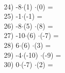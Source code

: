 \documentclass[a4paper,10pt]{article}
\begin{document}
\vspace{0.5cm}\\24)   -8$\cdot$(1) $\cdot$(0) =
\vspace{0.5cm}\\25)   -1$\cdot$(-1) =
\vspace{0.5cm}\\26)   -8$\cdot$(5) $\cdot$(8) =
\vspace{0.5cm}\\27)   -10$\cdot$(6) $\cdot$(-7) =
\vspace{0.5cm}\\28)   6$\cdot$(6) $\cdot$(3) =
\vspace{0.5cm}\\29)   -4$\cdot$(-10) $\cdot$(-9) =
\vspace{0.5cm}\\30)   0$\cdot$(-7) $\cdot$(2) =
\vspace{0.5cm}\\\pagebreak
\end{document}
